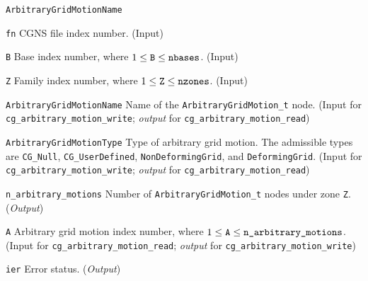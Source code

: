 \begin{Ventryi}{\texttt{ArbitraryGridMotionName}}\raggedright
\item [\texttt{fn}]
      CGNS file index number.
      (\textcolor{input}{Input})
\item [\texttt{B}]
      Base index number, where $1 \leq \text{\texttt{B}} \leq \text{\texttt{nbases}}$.
      (\textcolor{input}{Input})
\item [\texttt{Z}]
      Family index number, where $1 \leq \text{\texttt{Z}} \leq \text{\texttt{nzones}}$.
      (\textcolor{input}{Input})
\item [\texttt{ArbitraryGridMotionName}]
      Name of the \texttt{ArbitraryGridMotion\_t} node.
      (\textcolor{input}{Input} for \texttt{cg\_arbitrary\_motion\_write};
      \textcolor{output}{\textit{output}} for \texttt{cg\_arbitrary\_motion\_read})
\item [\texttt{ArbitraryGridMotionType}]
      Type of arbitrary grid motion.
      The admissible types are \texttt{CG\_Null}, \texttt{CG\_UserDefined},
      \texttt{NonDeformingGrid}, and \texttt{DeformingGrid}.
      (\textcolor{input}{Input} for \texttt{cg\_arbitrary\_motion\_write};
      \textcolor{output}{\textit{output}} for \texttt{cg\_arbitrary\_motion\_read})
\item [\texttt{n\_arbitrary\_motions}]
      Number of \texttt{ArbitraryGridMotion\_t} nodes under zone \texttt{Z}.
      (\textcolor{output}{\textit{Output}})
\item [\texttt{A}]
      Arbitrary grid motion index number, where $1 \leq \text{\texttt{A}} \leq \text{\texttt{n\_arbitrary\_motions}}$.
      (\textcolor{input}{Input} for \texttt{cg\_arbitrary\_motion\_read};
      \textcolor{output}{\textit{output}} for \texttt{cg\_arbitrary\_motion\_write})
\item [\texttt{ier}]
      Error status.
      (\textcolor{output}{\textit{Output}})
\end{Ventryi}
